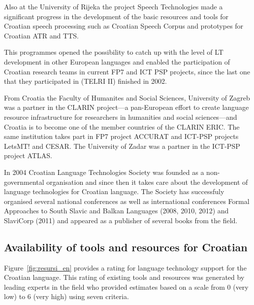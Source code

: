 \begin{multicols}{2}
Also at the University of Rijeka the project Speech Technologies \cite{str38} made a significant progress in the development of the basic resources and tools for Croatian speech processing such as Croatian Speech Corpus and prototypes for Croatian ATR and TTS.

This programmes opened the possibility to catch up with the level of LT development in other European languages and enabled the participation of Croatian research teams in current FP7 and ICT PSP projects, since the last one that they participated in (TELRI II) finished in 2002.

From Croatia the Faculty of Humanites and Social Sciences, University of Zagreb was a partner in the CLARIN project—a pan-European effort to create language resource infrastructure for researchers in humanities and social sciences—and Croatia is to become one of the member countries of the CLARIN ERIC. The same institution takes part in FP7 project ACCURAT and ICT-PSP projects LetsMT! and CESAR. The University of Zadar was a partner in the ICT-PSP project ATLAS.

In 2004 Croatian Language Technologies Society \cite{str35} was founded as a non-governmental organisation and since then it takes care about the development of language technologies for Croatian language. The Society has successfuly organised several national conferences as well as international conferences Formal Approaches to South Slavic and Balkan Languages (2008, 2010, 2012) and SlaviCorp (2011) and appeared as a publisher of several books from the field.


\subsection{Availability of tools and resources for Croatian}

Figure~\ref{fig:resursi_en} provides a rating for language technology support for the Croatian language. This rating of existing tools and resources was generated by leading experts in the field who provided estimates based on a scale from 0 (very low) to 6 (very high) using seven criteria.


\end{multicols}
